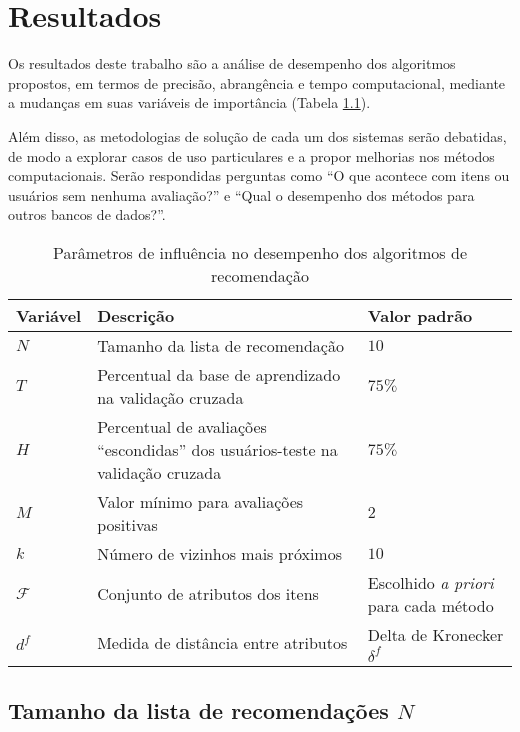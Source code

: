 \chapter[Resultados]{Resultados}
\label{chap:resultados}

Os resultados deste trabalho são a análise de desempenho dos algoritmos propostos, em termos de precisão, abrangência e tempo computacional, mediante a mudanças em suas variáveis de importância (Tabela \ref{tab:variaveis}). 

Além disso, as metodologias de solução de cada um dos sistemas serão debatidas, de modo a explorar casos de uso particulares e a propor melhorias nos métodos computacionais. Serão respondidas perguntas como ``O que acontece com itens ou usuários sem nenhuma avaliação?'' e ``Qual o desempenho dos métodos para outros bancos de dados?''.

\begin{table}[hp]
\begin{center}
    \caption{Parâmetros de influência no desempenho dos algoritmos de recomendação}
    \label{tab:variaveis}
    \begin{tabular}{  | p{2cm} | p{7cm} | p{3.5cm} | } 
    \hline
    \textbf{Variável} & \textbf{Descrição} & \textbf{Valor padrão}  \\ \hline
    $N$ & Tamanho da lista de recomendação & $10$ \\ \hline   
    $T$ & Percentual da base de aprendizado na validação cruzada & $75\%$ \\ \hline
    $H$ & Percentual de avaliações ``escondidas'' dos usuários-teste na validação cruzada & $75\%$ \\ \hline
    $M$ & Valor mínimo para avaliações positivas & $2$ \\ \hline
    $k$ & Número de vizinhos mais próximos & $10$ \\ \hline
    $\mathcal{F}$ & Conjunto de atributos dos itens & Escolhido \textit{a priori} para cada método \\ \hline
    $d^f$ & Medida de distância entre atributos & Delta de Kronecker $\delta^f$ \\ \hline
    \end{tabular}
\end{center}
\end{table}

\section{Tamanho da lista de recomendações $N$} %
\label{sec:tamanho_da_lista_de_recomenda_es_}


